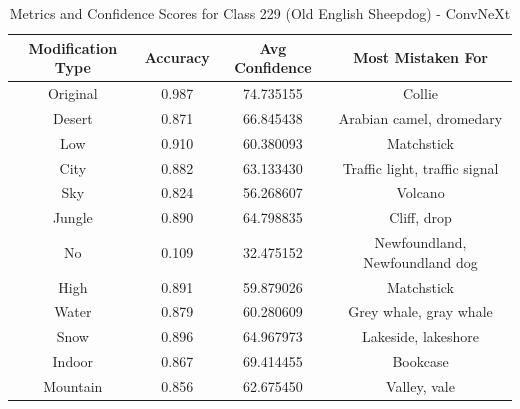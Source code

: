 \begin{table}
	\centering
	\begin{tabular}{|c|c|c|c|}
		\hline
		\textbf{Modification Type} & \textbf{Accuracy} & \textbf{Avg Confidence} & \textbf{Most Mistaken For} \\
		\hline
		Original & 0.987 & 74.735155 & Collie \\
		\hline
		Desert & 0.871 & 66.845438 & Arabian camel, dromedary \\
		\hline
		Low & 0.910 & 60.380093 & Matchstick \\
		\hline
		City & 0.882 & 63.133430 & Traffic light, traffic signal \\
		\hline
		Sky & 0.824 & 56.268607 & Volcano \\
		\hline
		Jungle & 0.890 & 64.798835 & Cliff, drop \\
		\hline
		No & 0.109 & 32.475152 & Newfoundland, Newfoundland dog \\
		\hline
		High & 0.891 & 59.879026 & Matchstick \\
		\hline
		Water & 0.879 & 60.280609 & Grey whale, gray whale \\
		\hline
		Snow & 0.896 & 64.967973 & Lakeside, lakeshore \\
		\hline
		Indoor & 0.867 & 69.414455 & Bookcase \\
		\hline
		Mountain & 0.856 & 62.675450 & Valley, vale \\
		\hline
	\end{tabular}
	\caption{Metrics and Confidence Scores for Class 229 (Old English Sheepdog) - ConvNeXt}
	\label{tab:metrics_confidence_class_229_convnext}
\end{table}

